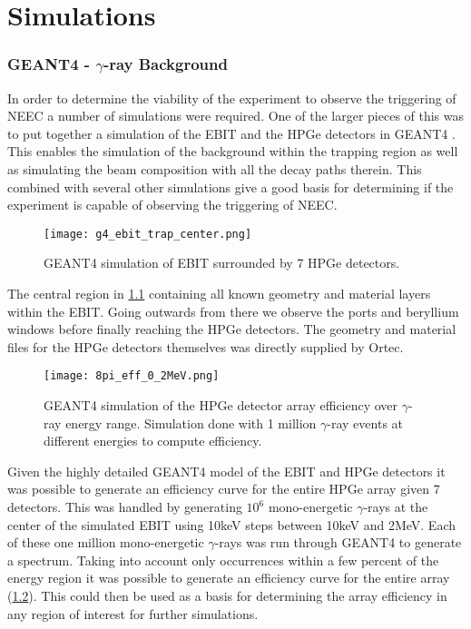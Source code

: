 \documentclass[jon_ringuette_thesis_proposal.tex]{subfiles}
\begin{document}
    \chapter{Simulations}

    \subsection{GEANT4 - $\gamma$-ray Background}
    In order to determine the viability of the experiment to observe the triggering of NEEC a number of simulations were required.
    One of the larger pieces of this was to put together a simulation of the EBIT and the HPGe detectors in GEANT4 \cite{Agostinelli2003}.
    This enables the simulation of the background within the trapping region as well as simulating the beam composition with all the decay paths therein.
    This combined with several other simulations give a good basis for determining if the experiment is capable of observing the triggering of NEEC.
    \begin{figure}[H]
        \begin{center}

            \texttt{[image: g4\_ebit\_trap\_center.png]}
        \end{center}
        \caption{\small GEANT4 simulation of EBIT surrounded by 7 HPGe detectors.}
        \label{fig:g4_ebit_8pis}
    \end{figure}

    The central region in \ref{fig:g4_ebit_8pis} containing all known geometry and material layers within the EBIT.
    Going outwards from there we observe the ports and beryllium windows before finally reaching the HPGe detectors.
    The geometry and material files for the HPGe detectors themselves was directly supplied by Ortec.

    \begin{figure}[H]
        \begin{center}
            \texttt{[image: 8pi\_eff\_0\_2MeV.png]}
        \end{center}
        \caption{\small GEANT4 simulation of the HPGe detector array efficiency over $\gamma$-ray energy range. Simulation done with 1 million $\gamma$-ray events at different energies to compute efficiency.}
        \label{fig:g4_efficiency_8pi}
    \end{figure}

    Given the highly detailed GEANT4 model of the EBIT and HPGe detectors it was possible to generate an efficiency curve for the entire HPGe array given 7 detectors.
    This was handled by generating $10^6$ mono-energetic $\gamma$-rays at the center of the simulated EBIT using 10keV steps between 10keV and 2MeV.
    Each of these one million mono-energetic $\gamma$-rays was run through GEANT4 to generate a spectrum.
    Taking into account only occurrences within a few percent of the energy region it was possible to generate an efficiency curve for the entire array (\ref{fig:g4_efficiency_8pi}).
    This could then be used as a basis for determining the array efficiency in any region of interest for further simulations.
\end{document}

